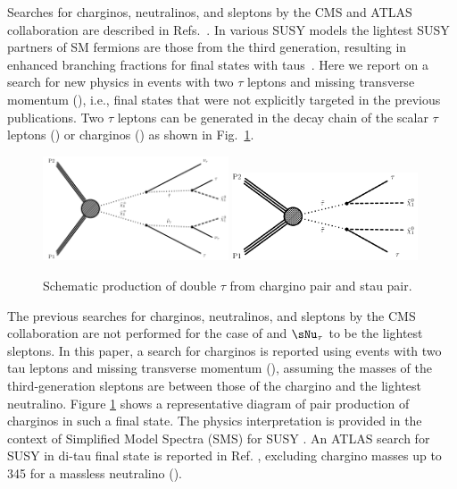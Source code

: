 Searches for charginos, neutralinos, and sleptons by the CMS and ATLAS collaboration are described in Refs.~\cite{Khachatryan:2014qwa,Khachatryan:2014mma,Khachatryan:2015kxa,Aad:2014nua,Aad:2014vma}.
In various SUSY models  the lightest SUSY partners of SM fermions are those from the third generation,
resulting in enhanced branching fractions for final states with taus~\cite{Martin:1997ns}.  Here we report on a search for new physics in events
with two $\tau$ leptons and missing transverse momentum (\MPT), i.e., final states that were not explicitly targeted in the previous publications.
Two $\tau$ leptons can be generated in the decay chain of the scalar $\tau$ leptons (\sTau) or charginos (\PSGcpDo) as shown in Fig.~\ref{fig:Productions}.
\begin{figure}[!Hhtb]
\centering
\includegraphics[width=0.49\textwidth]{Introductionfigs/TChipmSlepSnu.pdf}
\includegraphics[width=0.49\textwidth]{Introductionfigs/TSlepSlep.pdf}
\caption{Schematic production of double $\tau$ from chargino pair and stau pair.}
\label{fig:Productions}
\end{figure}


The previous searches for charginos, neutralinos,
and sleptons by the CMS collaboration \cite{Khachatryan:2014qwa} are not performed for the case of \stau and $\sNu_\tau$
to be the lightest sleptons. In this paper, a search for charginos is reported using events with two tau leptons and
missing transverse momentum (\MPT), assuming the masses of the third-generation sleptons are between those of the
chargino and the lightest neutralino.
Figure \ref{fig:Productions}
shows a representative diagram of pair production of charginos in such a final state. 
The physics interpretation is provided in the context of Simplified Model Spectra (SMS) for SUSY \cite{Alwall:2008ag,alves:sms}.
An ATLAS search for SUSY in di-tau final state is reported in Ref. \cite{Aad:2014yka}, excluding chargino masses up to 345 \GeV 
for a massless neutralino (\PSGczDo).

